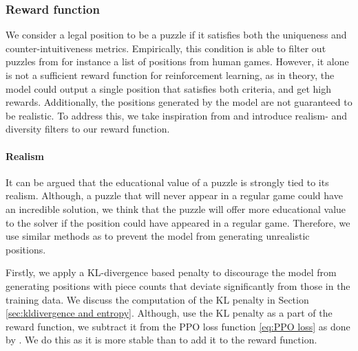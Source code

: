 
\subsubsection{Reward function}
\label{sec:reward function}

We consider a legal position to be a puzzle if it satisfies both the uniqueness and counter-intuitiveness metrics. Empirically, this condition is able to filter out puzzles from for instance a list of positions from human games. However, it alone is not a sufficient reward function for reinforcement learning, as in theory, the model could output a single position that satisfies both criteria, and get high rewards. Additionally, the positions generated by the model are not guaranteed to be realistic. To address this, we take inspiration from \citeauthor{feng2025generatingcreativechesspuzzles} and introduce realism- and diversity filters to our reward function.



\paragraph{Realism}



It can be argued that the educational value of a puzzle is strongly tied to its realism. Although, a puzzle that will never appear in a regular game could have an incredible solution, we think that the puzzle will offer more educational value to the solver if the position could have appeared in a regular game. Therefore, we use similar methods as \citeauthor{feng2025generatingcreativechesspuzzles} to prevent the model from generating unrealistic positions.

Firstly, we apply a KL-divergence based penalty to discourage the model from generating positions with piece counts that deviate significantly from those in the training data. We discuss the computation of the KL penalty in Section \ref{sec:kldivergence and entropy}. Although, \citeauthor{feng2025generatingcreativechesspuzzles} use the KL penalty as a part of the reward function, we subtract it from the PPO loss function \eqref{eq:PPO loss} as done by \citeauthor{ou2025principledrldiffusionllms}. We do this as it is more stable than to add it to the reward function.

